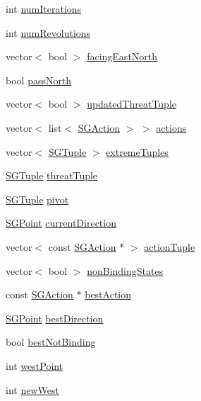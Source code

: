 \begin{DoxyCompactItemize}
int \hyperlink{classSGApproximation_a2898a820d159794c48e5611ee3937ca8}{num\-Iterations}
\item 
int \hyperlink{classSGApproximation_a9772bd4fa2add763f1177f87149c5d07}{num\-Revolutions}
\item 
vector$<$ bool $>$ \hyperlink{classSGApproximation_a35e422ed70d04b22ea8719cbc0f2fb6a}{facing\-East\-North}
\item 
bool \hyperlink{classSGApproximation_a054de05172362fe53f74488e9ab5a026}{pass\-North}
\item 
vector$<$ bool $>$ \hyperlink{classSGApproximation_afb83095fff0f02df719ed3654abab5a8}{updated\-Threat\-Tuple}
\item 
vector$<$ list$<$ \hyperlink{classSGAction}{S\-G\-Action} $>$ $>$ \hyperlink{classSGApproximation_abd29fc968e004b53a2d59702657a2b70}{actions}
\item 
vector$<$ \hyperlink{classSGTuple}{S\-G\-Tuple} $>$ \hyperlink{classSGApproximation_ac55fd302328ae8fbe4d1f8cf24a7ba32}{extreme\-Tuples}
\item 
\hyperlink{classSGTuple}{S\-G\-Tuple} \hyperlink{classSGApproximation_aee3bab15aee351f8a543df2799f2c9f6}{threat\-Tuple}
\item 
\hyperlink{classSGTuple}{S\-G\-Tuple} \hyperlink{classSGApproximation_ad7e37739a8b457ebe4a1c1e32bf9ca6c}{pivot}
\item 
\hyperlink{classSGPoint}{S\-G\-Point} \hyperlink{classSGApproximation_a603408048cb6c1a13078c27a017e8202}{current\-Direction}
\item 
vector$<$ const \hyperlink{classSGAction}{S\-G\-Action} $\ast$ $>$ \hyperlink{classSGApproximation_a70b2b3ee6577efd50e7cbe49b464f232}{action\-Tuple}
\item 
vector$<$ bool $>$ \hyperlink{classSGApproximation_a42b53c0e82dfa456f3153bcc79185dcd}{non\-Binding\-States}
\item 
const \hyperlink{classSGAction}{S\-G\-Action} $\ast$ \hyperlink{classSGApproximation_ab2a6d6ed6880fb4cbc05e671b6b6673a}{best\-Action}
\item 
\hyperlink{classSGPoint}{S\-G\-Point} \hyperlink{classSGApproximation_a1dd4f78e0789e61ee5c467afc403fc6d}{best\-Direction}
\item 
bool \hyperlink{classSGApproximation_a3f55b0a9fb9f8e2c3ae6949bc8fd046c}{best\-Not\-Binding}
\item 
int \hyperlink{classSGApproximation_ad64f17c049fda984e3f4e955a372a9d6}{west\-Point}
\item 
int \hyperlink{classSGApproximation_a82f819dc38d837e69d60225823a64671}{new\-West}
\end{DoxyCompactItemize}
